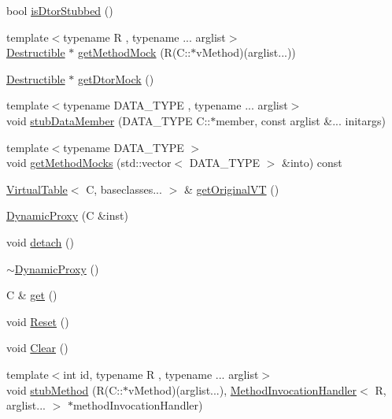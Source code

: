 \begin{DoxyCompactItemize}
\item 
bool \mbox{\hyperlink{structfakeit_1_1DynamicProxy_a6d3f0dfa93dc98b37fb50002bc4ea2bc}{is\+Dtor\+Stubbed}} ()
\item 
{\footnotesize template$<$typename R , typename ... arglist$>$ }\\\mbox{\hyperlink{classfakeit_1_1Destructible}{Destructible}} $\ast$ \mbox{\hyperlink{structfakeit_1_1DynamicProxy_a9774578f92b4d0258c72192dd16d6d0e}{get\+Method\+Mock}} (R(C\+::$\ast$v\+Method)(arglist...))
\item 
\mbox{\hyperlink{classfakeit_1_1Destructible}{Destructible}} $\ast$ \mbox{\hyperlink{structfakeit_1_1DynamicProxy_a32f8a09734ef6d70162d682fd593707b}{get\+Dtor\+Mock}} ()
\item 
{\footnotesize template$<$typename D\+A\+T\+A\+\_\+\+T\+Y\+PE , typename ... arglist$>$ }\\void \mbox{\hyperlink{structfakeit_1_1DynamicProxy_a872480e95dba48c6e690fb7cdc017f9d}{stub\+Data\+Member}} (D\+A\+T\+A\+\_\+\+T\+Y\+PE C\+::$\ast$member, const arglist \&... initargs)
\item 
{\footnotesize template$<$typename D\+A\+T\+A\+\_\+\+T\+Y\+PE $>$ }\\void \mbox{\hyperlink{structfakeit_1_1DynamicProxy_a21e8fdd6bcf64b2d7e0b86261529da35}{get\+Method\+Mocks}} (std\+::vector$<$ D\+A\+T\+A\+\_\+\+T\+Y\+PE $>$ \&into) const
\item 
\mbox{\hyperlink{structfakeit_1_1VirtualTable}{Virtual\+Table}}$<$ C, baseclasses... $>$ \& \mbox{\hyperlink{structfakeit_1_1DynamicProxy_aa34a496518156007196fd405dbf2e058}{get\+Original\+VT}} ()
\item 
\mbox{\hyperlink{structfakeit_1_1DynamicProxy_a417e0221b7df3845b201a9e4a1f5028b}{Dynamic\+Proxy}} (C \&inst)
\item 
void \mbox{\hyperlink{structfakeit_1_1DynamicProxy_a154f25eeeb36c0635d9209dd5870943e}{detach}} ()
\item 
\mbox{\hyperlink{structfakeit_1_1DynamicProxy_a05e9d9c1bcaf4bcd14d1b6311e16c809}{$\sim$\+Dynamic\+Proxy}} ()
\item 
C \& \mbox{\hyperlink{structfakeit_1_1DynamicProxy_af8e4100c2d995a26bf3209e68c11d12a}{get}} ()
\item 
void \mbox{\hyperlink{structfakeit_1_1DynamicProxy_a8f00dd7c68a247f715ec3925f662de9f}{Reset}} ()
\item 
void \mbox{\hyperlink{structfakeit_1_1DynamicProxy_a995c7e3dd97dc7707f18774eb4554b45}{Clear}} ()
\item 
{\footnotesize template$<$int id, typename R , typename ... arglist$>$ }\\void \mbox{\hyperlink{structfakeit_1_1DynamicProxy_ab1a98295698cf6eed3ff04ed4b838e51}{stub\+Method}} (R(C\+::$\ast$v\+Method)(arglist...), \mbox{\hyperlink{structfakeit_1_1MethodInvocationHandler}{Method\+Invocation\+Handler}}$<$ R, arglist... $>$ $\ast$method\+Invocation\+Handler)

\end{DoxyCompactItemize}
